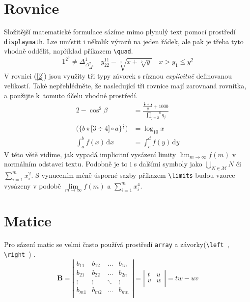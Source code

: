\documentclass [11pt, a4paper, twocolumn] {article}
\begin{document}
\section{Rovnice}
Složitější matematické formulace sázíme mimo plynulý text pomocí prostředí \verb|displaymath|. 
Lze umístit i několik výrazů na jeden řádek, ale pak je třeba tyto vhodně oddělit, například příkazem \verb|\quad|.
\begin{displaymath}
    1^{2^{3}} \neq \Delta_{\Delta_{\Delta^{3}}^{2}}^{1}
    \quad
    y_{22}^{11}-\sqrt[9]{x + \sqrt[7]{y}}
    \quad
    x > y_{1} \leq y^{2}
\end{displaymath}
V rovnici (\ref{2}) jsou využity tři typy závorek s různou \textit{ex\-plicitně} definovanou velikostí. 
Také nepřehlédněte, že nasledující tři rovnice mají zarovnaná rovnítka, a použijte k~tomuto účelu vhodné prostředí. 
\begin{alignat}{2}
    -\cos^{2} \beta &= \frac{\frac{\frac{1}{x}+\frac{1}{3} }{y}+1000 }{ \overset{8}{\underset{j=2}{\prod}} q_{j} }\\
    \bigg( \bigl\{ b \star \big[ 3 \div 4 \big] \circ a \bigr\}^{\frac{2}{3}}    \bigg) &= \log_{10} x \label{2}\\
    \int_a^b  f(x)\, \mathrm{d}x &= \int_c^d  f(y)\, \mathrm{d}y \label{3}
\end{alignat}
V této větě vidíme, jak vypadá implicitní vysázení limity $\lim_{m \rightarrow \infty} f(m)  $ v normálním odstavci textu. 
Podobně je to i s dalšími symboly jako $\bigcup_{N \in \mathcal{M}} N $ či  $ \sum_{i=1}^{m} x_{i}^{2} $. S vynucením méně úsporné sazby příkazem \verb|\limits| budou vzorce vysázeny v podobě $ \lim\limits_{m \rightarrow \infty} f(m) $ a $ \sum\limits_{i=1}^{m} x_{i}^{4} $.

\section{Matice}
Pro sázení matic se velmi často používá prostředí \verb|array| a závorky(\verb|\left |, \verb|\right |) .
    \[
        \mathbf{B}=
    \left|
    \begin{array}{cccc} 
        b_{11} & b_{12} & \dots & b_{1n}\\
        b_{21} & b_{22} & \dots & b_{2n}\\
        \vdots & \vdots & \ddots & \vdots \\
        b_{m1} & b_{m2} & \dots & b_{mn}\\
    \end{array}
    \right|
    =
    \left|
    \begin{array}{cc} 
        t & u\\
        v & w\\
    \end{array}
    \right|
    =
    tw - uv
    \]
\end{document}
